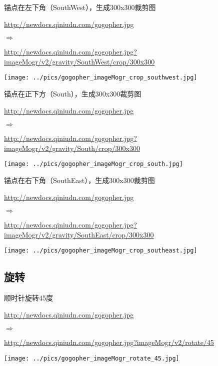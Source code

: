 \documentclass[11pt, oneside]{book}
\newcommand{\qsym}[1]{
\footnotesize
\noindent
#1\par
\normalsize
}
\newcommand{\qsamplelink}[1]{
\vspace{0.2em}
\noindent
#1\par
\vspace{0.1em}
}
\newcommand{\qurl}[1]{\footnotesize\url{#1}\normalsize}
\begin{document}
\begin{sample}
  \caption{锚点在左下角（SouthWest），生成300x300裁剪图}
    \qsamplelink{\qurl{http://newdocs.qiniudn.com/gogopher.jpg}}
    \qsym{$\Rightarrow$}
    \qsamplelink{\qurl{http://newdocs.qiniudn.com/gogopher.jpg?imageMogr/v2/gravity/SouthWest/crop/300x300}}

    \begin{center}
      \texttt{[image: ../pics/gogopher\_imageMogr\_crop\_southwest.jpg]}
    \end{center}
  \label{imageMogr-crop-southwest}
\end{sample}

\begin{sample}
  \caption{锚点在正下方（South），生成300x300裁剪图}
    \qsamplelink{\qurl{http://newdocs.qiniudn.com/gogopher.jpg}}
    \qsym{$\Rightarrow$}
    \qsamplelink{\qurl{http://newdocs.qiniudn.com/gogopher.jpg?imageMogr/v2/gravity/South/crop/300x300}}

    \begin{center}
      \texttt{[image: ../pics/gogopher\_imageMogr\_crop\_south.jpg]}
    \end{center}
  \label{imageMogr-crop-south}
\end{sample}

\begin{sample}
  \caption{锚点在右下角（SouthEast），生成300x300裁剪图}
    \qsamplelink{\qurl{http://newdocs.qiniudn.com/gogopher.jpg}}
    \qsym{$\Rightarrow$}
    \qsamplelink{\qurl{http://newdocs.qiniudn.com/gogopher.jpg?imageMogr/v2/gravity/SouthEast/crop/300x300}}

    \begin{center}
      \texttt{[image: ../pics/gogopher\_imageMogr\_crop\_southeast.jpg]}
    \end{center}
  \label{imageMogr-crop-southeast}
\end{sample}

\clearpage

\subsection{旋转}

\begin{sample}
  \caption{顺时针旋转45度}
    \qsamplelink{\qurl{http://newdocs.qiniudn.com/gogopher.jpg}}
    \qsym{$\Rightarrow$}
    \qsamplelink{\qurl{http://newdocs.qiniudn.com/gogopher.jpg?imageMogr/v2/rotate/45}}

    \begin{center}
      \texttt{[image: ../pics/gogopher\_imageMogr\_rotate\_45.jpg]}
    \end{center}
  \label{imageMogr-rotate-45}
\end{sample}
\end{document}

